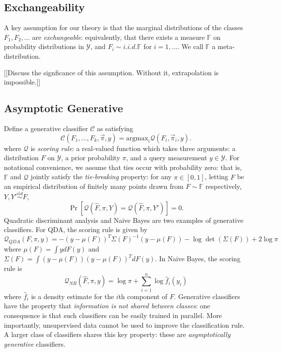 \documentclass{article}
\newcommand{\argmax}{\text{argmax}}
\begin{document}
\subsection{Exchangeability}

A key assumption for our theory is that the marginal distributions of
the classes $F_1, F_2, \hdots$ are \emph{exchangeable}: equivalently,
that there exists a measure $\mathbb{F}$ on probability distributions
in $\mathcal{Y}$, and $F_i \sim{i.i.d.} \mathbb{F}$ for $i =
1,\hdots$.  We call $\mathbb{F}$ a meta-distribution.

[[Discuss the signficance of this assumption.  Without it, extrapolation is impossible.]]

\subsection{Asymptotic Generative}

Define a generative classifier $\mathcal{C}$ as satisfying
 \[
\mathcal{C}(F_1,\hdots, F_k, \vec{\pi}, y) = \argmax_i \mathcal{Q}(F_i, \vec{\pi}_i, y).
\]
where $\mathcal{Q}$ is \emph{scoring rule}: a real-valued function
which takes three arguments: a distribution $F$ on $\mathcal{Y}$, a
prior probability $\pi$, and a query measurement $y \in \mathcal{Y}$.
For notational convenience, we assume that ties occur with probability
zero: that is, $\mathbb{F}$ and $\mathcal{Q}$ jointly satisfy the
\emph{tie-breaking} property: for any $\pi \in [0,1]$, letting
$\hat{F}$ be an empirical distribution of finitely many points drawn
from $F \sim \mathbb{F}$ respectively, $Y, Y' \stackrel{iid}{\sim} F$,
\begin{equation}\label{eq:tie}
\Pr[\mathcal{Q}(\hat{F}, \pi, Y) = \mathcal{Q}(\hat{F}, \pi, Y')] = 0.
\end{equation}
Quadratic discriminant analysis and Naive Bayes are two examples of
generative classifiers.  For QDA, the scoring rule is given by
\[
\mathcal{Q}_{QDA}(F, \pi, y) = -(y - \mu(F))^T \Sigma(F)^{-1} (y-\mu(F)) - \log\det(\Sigma(F)) + 2\log\pi
\]
where $\mu(F) = \int y dF(y)$ and $\Sigma(F) = \int (y-\mu(F))(y-\mu(F))^T dF(y)$.
In Naive Bayes, the scoring rule is
\[
\mathcal{Q}_{NB}(\hat{F}, \pi, y) = \log\pi + \sum_{i=1}^n \log \hat{f}_i(y_i)
\]
where $\hat{f}_i$ is a density estimate for the $i$th component of
$F$.  Generative classifiers have the property that \emph{information
  is not shared between classes}: one consequence is that such
classifiers can be easily trained in parallel.  More importantly,
unsupervised data cannot be used to improve the classification rule.
A larger class of classifiers shares this key property: these are
\emph{asymptotically generative} classifiers.
\end{document}
